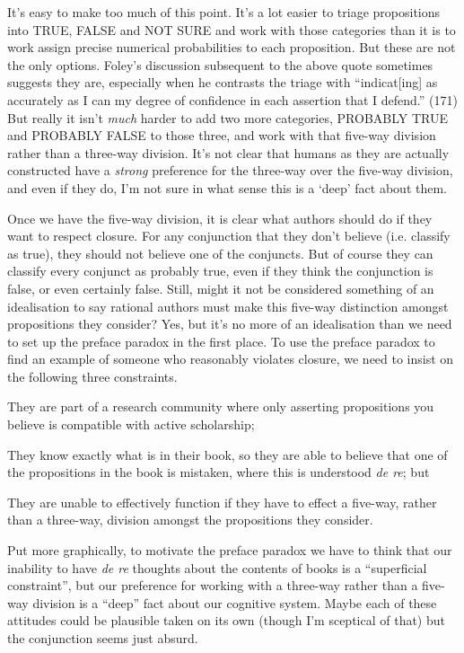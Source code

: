 It's easy to make too much of this point. It's a lot easier to triage propositions into TRUE, FALSE and NOT SURE and work with those categories than it is to work assign precise numerical probabilities to each proposition. But these are not the only options. Foley's discussion subsequent to the above quote sometimes suggests they are, especially when he contrasts the triage with ``indicat[ing] as accurately as I can my degree of confidence in each assertion that I defend.'' (171) But really it isn't \textit{much} harder to add two more categories, PROBABLY TRUE and PROBABLY FALSE to those three, and work with that five-way division rather than a three-way division. It's not clear that humans as they are actually constructed have a \textit{strong} preference for the three-way over the five-way division, and even if they do, I'm not sure in what sense this is a `deep' fact about them.

Once we have the five-way division, it is clear what authors should do if they want to respect closure. For any conjunction that they don't believe (i.e. classify as true), they should not believe one of the conjuncts. But of course they can classify every conjunct as probably true, even if they think the conjunction is false, or even certainly false. Still, might it not be considered something of an idealisation to say rational authors must make this five-way distinction amongst propositions they consider? Yes, but it's no more of an idealisation than we need to set up the preface paradox in the first place. To use the preface paradox to find an example of someone who reasonably violates closure, we need to insist on the following three constraints.

\begin{enumerate*}
\renewcommand{\labelenumi}{\alph{enumi})}
\item They are part of a research community where only asserting propositions you believe is compatible with active scholarship;
\item They know exactly what is in their book, so they are able to believe that one of the propositions in the book is mistaken, where this is understood \textit{de re}; but
\item They are unable to effectively function if they have to effect a five-way, rather than a three-way, division amongst the propositions they consider.
\end{enumerate*}

\noindent Put more graphically, to motivate the preface paradox we have to think that our inability to have \textit{de re} thoughts about the contents of books is a ``superficial constraint'', but our preference for working with a three-way rather than a five-way division is a ``deep'' fact about our cognitive system. Maybe each of these attitudes could be plausible taken on its own (though I'm sceptical of that) but the conjunction seems just absurd.

